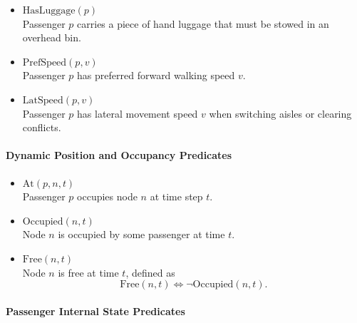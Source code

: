 \documentclass[11pt,a4paper]{article}
\begin{document}
\begin{itemize}

\item $\text{HasLuggage}(p)$\\
Passenger $p$ carries a piece of hand luggage that must be stowed in an overhead bin.

\item $\text{PrefSpeed}(p,v)$\\
Passenger $p$ has preferred forward walking speed $v$.

\item $\text{LatSpeed}(p,v)$\\
Passenger $p$ has lateral movement speed $v$ when switching aisles or clearing conflicts.

\end{itemize}

\paragraph{Dynamic Position and Occupancy Predicates}

\begin{itemize}

\item $\text{At}(p,n,t)$\\
Passenger $p$ occupies node $n$ at time step $t$.

\item $\text{Occupied}(n,t)$\\
Node $n$ is occupied by some passenger at time $t$.

\item $\text{Free}(n,t)$\\
Node $n$ is free at time $t$, defined as
\[
\text{Free}(n,t) \iff \neg \text{Occupied}(n,t).
\]

\end{itemize}

\paragraph{Passenger Internal State Predicates}
\end{document}
